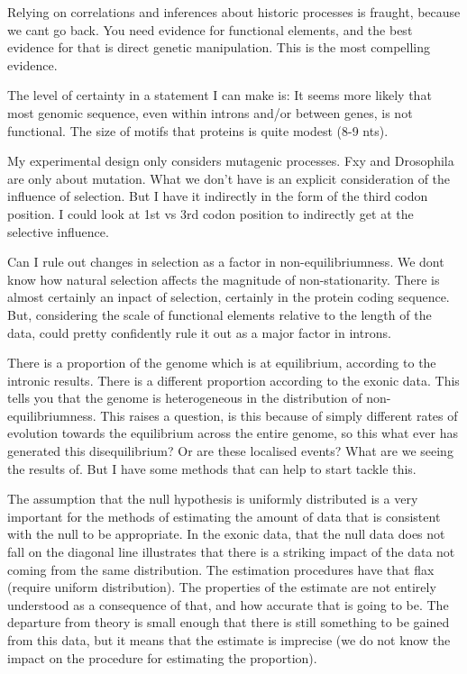 Relying on correlations and inferences about historic processes is fraught, because we cant go back. You need evidence for functional elements, and the best evidence for that is direct genetic manipulation. This is the most compelling evidence.

The level of certainty in a statement I can make is:
It seems more likely that most genomic sequence, even within introns and/or between genes, is not functional. The size of motifs that proteins is quite modest (8-9 nts). 

My experimental design only considers mutagenic processes. Fxy and Drosophila are only about mutation. What we don't have is an explicit consideration of the influence of selection. But I have it indirectly in the form of the third codon position. I could look at 1st vs 3rd codon position to indirectly get at the selective influence. 

Can I rule out changes in selection as a factor in non-equilibriumness. We dont know how natural selection affects the magnitude of non-stationarity. There is almost certainly an inpact of selection, certainly in the protein coding sequence. But, considering the scale of functional elements relative to the length of the data, could pretty confidently rule it out as a major factor in introns. 


There is a proportion of the genome which is at equilibrium, according to the intronic results. There is a different proportion according to the exonic data. This tells you that the genome is heterogeneous in the distribution of non-equilibriumness. This raises a question, is this because of simply different rates of evolution towards the equilibrium across the entire genome, so this what ever has generated this disequilibrium? Or are these localised events? What are we seeing the results of. But I have some methods that can help to start tackle this. 


The assumption that the null hypothesis is uniformly distributed is a very important for the methods of estimating the amount of data that is consistent with the null to be appropriate. In the exonic data, that the null data does not fall on the diagonal line illustrates that there is a striking impact of the data not coming from the same distribution. The estimation procedures have that flax (require uniform distribution). The properties of the estimate are not entirely understood as a consequence of that, and how accurate that is going to be. The departure from theory is small enough that there is still something to be gained from this data, but it means that the estimate is imprecise (we do not know the impact on the procedure for estimating the proportion). 



